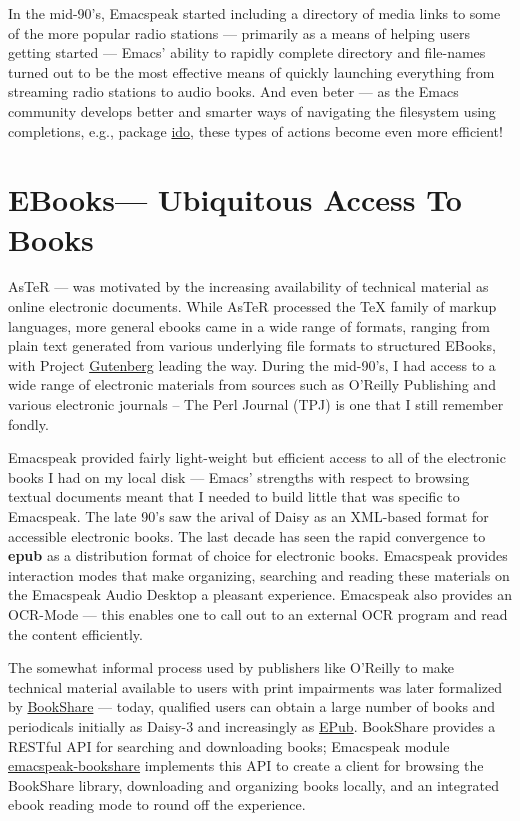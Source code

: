 \documentclass[11pt]{article}
\begin{document}
In the mid-90's, Emacspeak started including a directory of media
links to some of the more popular radio stations — primarily as a
means of helping users getting started — Emacs' ability to
rapidly complete directory and file-names turned out to be the
most effective means of quickly launching everything from
streaming radio stations to audio books. And even beter — as the
Emacs community develops better and smarter ways of navigating
the filesystem using completions, e.g., package \uline{ido}, these
types of actions become even more efficient!

\section{EBooks—   Ubiquitous Access To Books}
\label{sec-11}


AsTeR — was motivated by the increasing availability of technical
material as online electronic documents. While AsTeR processed
the \TeX{} family of markup languages, more general ebooks came in a
wide range of formats, ranging from plain text generated from
various underlying file formats to structured EBooks, with
Project \href{http://www.gutenberg.org/}{Gutenberg} leading the
way. During the mid-90's, I had access to a wide range of
electronic materials from sources such as O'Reilly Publishing and
various electronic journals -- The Perl Journal (TPJ) is one that
I still remember fondly.

Emacspeak provided fairly light-weight but efficient access to
all of the electronic books I had on my local disk — Emacs'
strengths with respect to browsing textual documents meant that I
needed to build little that was specific to Emacspeak. The late
90's saw the arival of Daisy as an XML-based format for
accessible electronic books. The last decade has seen the rapid
convergence to \textbf{epub} as a distribution format of choice for
electronic books. Emacspeak provides interaction modes that make
organizing, searching and reading these materials on the
Emacspeak Audio Desktop a pleasant experience. Emacspeak also
provides an OCR-Mode — this enables one to call out to an
external OCR program and read the content efficiently.

The somewhat informal process used by publishers like O'Reilly to
make technical material available to users with print impairments
was later formalized by \href{https://www.bookshare.org/}{BookShare} — today, qualified users can
obtain a large number of books and periodicals initially as
Daisy-3 and increasingly as \uline{EPub}. BookShare provides a RESTful
API for searching and downloading books; Emacspeak module
\uline{emacspeak-bookshare} implements this API to create a client for
browsing the BookShare library, downloading and organizing books
locally, and an integrated ebook reading mode to round off the
experience.
\end{document}
